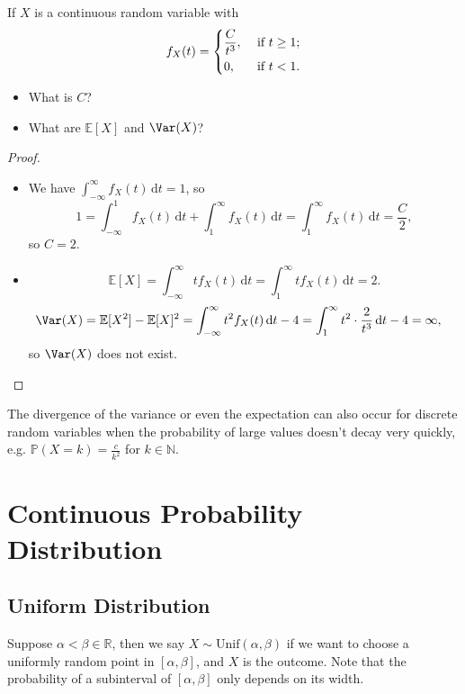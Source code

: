 \begin{eg}
    If \(X\) is a continuous random variable with 
    \[
        f_X(t) = \begin{dcases}
            \frac{C}{t^3}, &\text{ if } t \ge 1 ;\\
            0, &\text{ if } t < 1.
        \end{dcases}
    \]
    \begin{itemize}
        \item [(1)] What is \(C\)?
        \item [(2)] What are \(\mathbb{E} [X]\) and \(\Var(X)\)?  
    \end{itemize}
\end{eg}

\begin{proof}
    \hfill 
    \begin{itemize}
        \item [(1)] We have \(\int _{-\infty }^{\infty } f_X(t) \, \mathrm{d} t = 1 \), so 
        \[
            1 = \int _{-\infty }^1 f_X(t) \, \mathrm{d} t + \int _{1}^{\infty} f_X(t) \, \mathrm{d} t = \int _{1}^{\infty} f_X(t) \, \mathrm{d} t = \frac{C}{2},  
        \]
        so \(C = 2\).
        \item [(2)]
        \[
            \mathbb{E} [X] = \int _{-\infty }^{\infty } t f_X(t) \, \mathrm{d} t = \int _1^{\infty } t f_X(t) \, \mathrm{d} t = 2.  
        \]
        \begin{align*}
            \Var(X) &= \mathbb{E} [X^2] - \mathbb{E} [X]^2 = \int _{-\infty }^{\infty } t^2 f_X(t) \, \mathrm{d} t - 4 = \int _1^{\infty } t^2 \cdot \frac{2}{t^3} \, \mathrm{d} t - 4 = \infty,  
        \end{align*}
        so \(\Var(X)\) does not exist. 
    \end{itemize}
\end{proof}

\begin{remark}
    The divergence of the variance or even the expectation can also occur for discrete random variables when the probability of large values doesn't decay very quickly, e.g. \(\mathbb{P} (X = k) = \frac{c}{k^2}\) for \(k \in \mathbb{N} \).  
\end{remark}

\section{Continuous Probability Distribution}
\subsection{Uniform Distribution}
\begin{definition}
    Suppose \(\alpha < \beta \in \mathbb{R}\), then we say \(X \sim \mathrm{Unif}(\alpha , \beta ) \) if we want to choose a uniformly random point in \([\alpha , \beta ]\), and \(X\) is the outcome. Note that the probability of a subinterval of \([\alpha , \beta ]\) only depends on its width.      
\end{definition}

